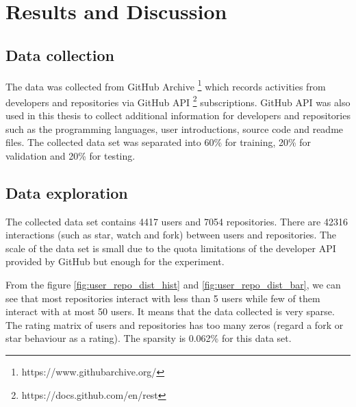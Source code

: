 \documentclass[11pt,twoside]{report}
\begin{document}



\chapter{Results and Discussion}
\section{Data collection}
The data was collected from GitHub Archive \footnote{https://www.githubarchive.org/} which records activities from developers and repositories via GitHub API \footnote{https://docs.github.com/en/rest} subscriptions. GitHub API was also used in this thesis to collect additional information for developers and repositories such as the programming languages, user introductions, source code and readme files. The collected data set was separated into 60\% for training, 20\% for validation and 20\% for testing.

\section{Data exploration}
The collected data set contains 4417 users and 7054 repositories. There are 42316 interactions (such as star, watch and fork) between users and repositories. The scale of the data set is small due to the quota limitations of the developer API provided by GitHub but enough for the experiment.

From the figure \ref{fig:user_repo_dist_hist} and \ref{fig:user_repo_dist_bar}, we can see that most repositories interact with less than 5 users while few of them interact with at most 50 users. It means that the data collected is very sparse. The rating matrix of users and repositories has too many zeros (regard a fork or star behaviour as a rating). The sparsity is 0.062\% for this data set.
\end{document}
